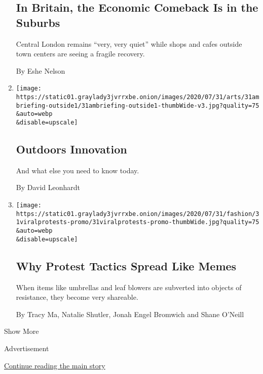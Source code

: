 \begin{enumerate}
  \hypertarget{in-britain-the-economic-comeback-is-in-the-suburbs}{%
  \subsection{In Britain, the Economic Comeback Is in the
  Suburbs}\label{in-britain-the-economic-comeback-is-in-the-suburbs}}

  Central London remains ``very, very quiet'' while shops and cafes
  outside town centers are seeing a fragile recovery.

  By Eshe Nelson
\item
  \href{/2020/07/31/briefing/nba-economy-herman-cain-your-friday-briefing.html}{}

  \texttt{[image: https://static01.graylady3jvrrxbe.onion/images/2020/07/31/arts/31ambriefing-outside1/31ambriefing-outside1-thumbWide-v3.jpg?quality=75\\\&auto=webp\\\&disable=upscale]}

  \hypertarget{outdoors-innovation}{%
  \subsection{Outdoors Innovation}\label{outdoors-innovation}}

  And what else you need to know today.

  By David Leonhardt
\item
  \href{/2020/07/31/style/viral-protest-videos.html}{}

  \texttt{[image: https://static01.graylady3jvrrxbe.onion/images/2020/07/31/fashion/31viralprotests-promo/31viralprotests-promo-thumbWide.jpg?quality=75\\\&auto=webp\\\&disable=upscale]}

  \hypertarget{why-protest-tactics-spread-like-memes}{%
  \subsection{Why Protest Tactics Spread Like
  Memes}\label{why-protest-tactics-spread-like-memes}}

  When items like umbrellas and leaf blowers are subverted into objects
  of resistance, they become very shareable.

  By Tracy Ma, Natalie Shutler, Jonah Engel Bromwich and Shane O'Neill
\end{enumerate}

Show More

Advertisement

\protect\hyperlink{after-mid4}{Continue reading the main story}


